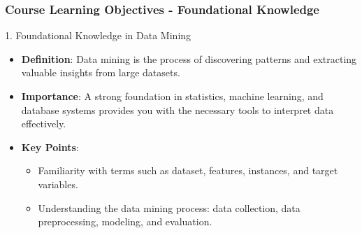 \documentclass{beamer}
\begin{document}
\begin{frame}[fragile]
    \frametitle{Course Learning Objectives - Foundational Knowledge}
    \begin{block}{1. Foundational Knowledge in Data Mining}
        \begin{itemize}
            \item \textbf{Definition}: Data mining is the process of discovering patterns and extracting valuable insights from large datasets.
            \item \textbf{Importance}: A strong foundation in statistics, machine learning, and database systems provides you with the necessary tools to interpret data effectively.
            \item \textbf{Key Points}:
            \begin{itemize}
                \item Familiarity with terms such as dataset, features, instances, and target variables.
                \item Understanding the data mining process: data collection, data preprocessing, modeling, and evaluation.
            \end{itemize}
        \end{itemize}
    \end{block}
\end{frame}
\end{document}

